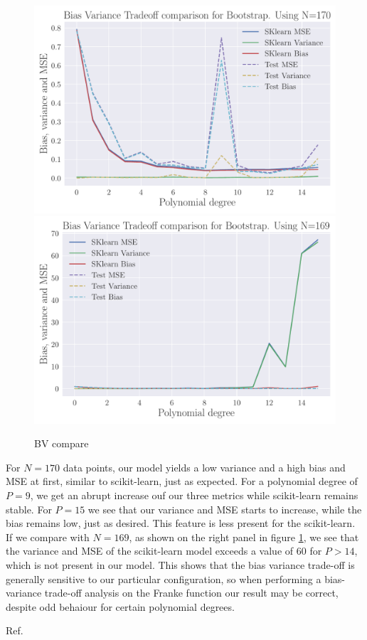 \documentclass[reprint,english,notitlepage,aps,nobalancelastpage,nofootinbib]{revtex4-1}  %
\begin{document}
\begin{figure}[H]
  \includegraphics[width=\linewidth]{Testing_OLS_BV_compare_n170.pdf}
  \endminipage\hfill
  \includegraphics[width=\linewidth]{Testing_OLS_BV_compare_n169.pdf}
  \endminipage
  \caption{BV compare}
  \label{fig:compare_BV_scikit}
\end{figure}

For $N=170$ data points, our model yields a low variance and a high bias and MSE at first, similar to scikit-learn, just as expected. For a polynomial degree of $P=9$, we get an abrupt increase ouf our three metrics while scikit-learn remains stable. For $P=15$ we see that our variance and MSE starts to increase, while the bias remains low, just as desired. This feature is less present for the scikit-learn. If we compare with $N=169$, as shown on the right panel in figure \ref{fig:compare_BV_scikit}, we see that the variance and MSE of the scikit-learn model exceeds a value of $60$ for $P>14$, which is not present in our model. This shows that the bias variance trade-off is generally sensitive to our particular configuration, so when performing a bias-variance trade-off analysis on the Franke function our result may be correct, despite odd behaiour for certain polynomial degrees.

\begin{thebibliography}{}
 Ref.

\end{thebibliography}
\end{document}
